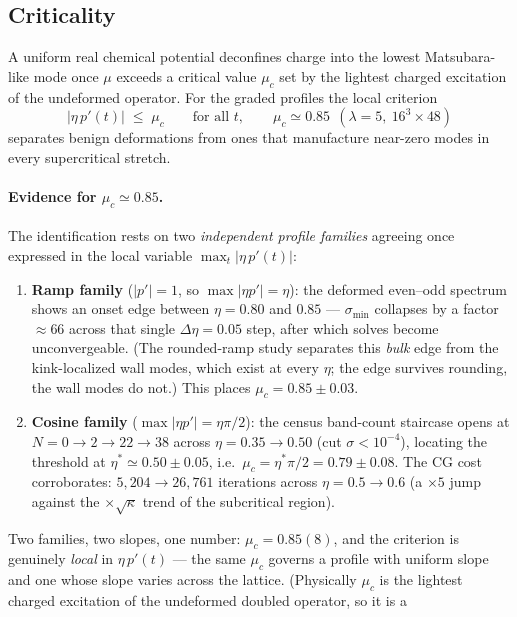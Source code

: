 \documentclass[11pt]{article}
\newcommand{\muc}{\mu_c}
\begin{document}
\subsection{Criticality}
\label{sec:crit}
A uniform real chemical potential deconfines charge into the lowest
Matsubara-like mode once $\mu$ exceeds a critical value $\muc$ set by
the lightest charged excitation of the undeformed operator.  For the
graded profiles the local criterion
\begin{equation}
|\eta\,p'(t)| \;\le\; \muc \qquad \text{for all } t,
\qquad \muc \simeq 0.85 \ \ (\lambda=5,\ 16^3\times48)
\end{equation}
separates benign deformations from ones that manufacture near-zero
modes in every supercritical stretch.

\paragraph{Evidence for $\muc \simeq 0.85$.}
The identification rests on two \emph{independent profile families}
agreeing once expressed in the local variable $\max_t|\eta\,p'(t)|$:
\begin{enumerate}
\item \textbf{Ramp family} ($|p'| = 1$, so $\max|\eta p'| = \eta$):
the deformed even--odd spectrum shows an onset edge between
$\eta = 0.80$ and $0.85$ --- $\sigma_{\min}$ collapses by a factor
$\approx 66$ across that single $\Delta\eta = 0.05$ step, after which
solves become unconvergeable.  (The rounded-ramp study separates this
\emph{bulk} edge from the kink-localized wall modes, which exist at
every $\eta$; the edge survives rounding, the wall modes do not.)
This places $\muc = 0.85 \pm 0.03$.
\item \textbf{Cosine family} ($\max|\eta p'| = \eta\pi/2$): the census
band-count staircase opens at
$N = 0 \to 2 \to 22 \to 38$ across $\eta = 0.35 \to 0.50$
(cut $\sigma < 10^{-4}$), locating the threshold at
$\eta^* \simeq 0.50\pm0.05$, i.e.\
$\muc = \eta^*\pi/2 = 0.79 \pm 0.08$.  The CG cost corroborates:
$5{,}204 \to 26{,}761$ iterations across $\eta = 0.5 \to 0.6$
(a $\times5$ jump against the $\times\sqrt{\kappa}$ trend of the
subcritical region).
\end{enumerate}
Two families, two slopes, one number: $\muc = 0.85(8)$, and the
criterion is genuinely \emph{local} in $\eta\,p'(t)$ --- the same
$\muc$ governs a profile with uniform slope and one whose slope varies
across the lattice.  (Physically $\muc$ is the lightest charged
excitation of the undeformed doubled operator, so it is a
\end{document}
